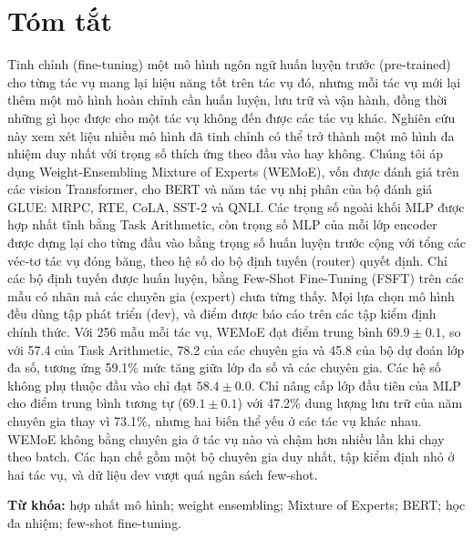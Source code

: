 \chapter*{Tóm tắt}

Tinh chỉnh (fine-tuning) một mô hình ngôn ngữ huấn luyện trước (pre-trained) cho từng tác vụ mang lại hiệu năng tốt trên tác vụ đó, nhưng mỗi tác vụ mới lại thêm một mô hình hoàn chỉnh cần huấn luyện, lưu trữ và vận hành, đồng thời những gì học được cho một tác vụ không đến được các tác vụ khác. Nghiên cứu này xem xét liệu nhiều mô hình đã tinh chỉnh có thể trở thành một mô hình đa nhiệm duy nhất với trọng số thích ứng theo đầu vào hay không. Chúng tôi áp dụng Weight-Ensembling Mixture of Experts (WEMoE), vốn được đánh giá trên các vision Transformer, cho BERT và năm tác vụ nhị phân của bộ đánh giá GLUE: MRPC, RTE, CoLA, SST-2 và QNLI. Các trọng số ngoài khối MLP được hợp nhất tĩnh bằng Task Arithmetic, còn trọng số MLP của mỗi lớp encoder được dựng lại cho từng đầu vào bằng trọng số huấn luyện trước cộng với tổng các véc-tơ tác vụ đóng băng, theo hệ số do bộ định tuyến (router) quyết định. Chỉ các bộ định tuyến được huấn luyện, bằng Few-Shot Fine-Tuning (FSFT) trên các mẫu có nhãn mà các chuyên gia (expert) chưa từng thấy. Mọi lựa chọn mô hình đều dùng tập phát triển (dev), và điểm được báo cáo trên các tập kiểm định chính thức. Với 256 mẫu mỗi tác vụ, WEMoE đạt điểm trung bình $69.9\pm0.1$, so với 57.4 của Task Arithmetic, 78.2 của các chuyên gia và 45.8 của bộ dự đoán lớp đa số, tương ứng 59.1\% mức tăng giữa lớp đa số và các chuyên gia. Các hệ số không phụ thuộc đầu vào chỉ đạt $58.4\pm0.0$. Chỉ nâng cấp lớp đầu tiên của MLP cho điểm trung bình tương tự ($69.1\pm0.1$) với 47.2\% dung lượng lưu trữ của năm chuyên gia thay vì 73.1\%, nhưng hai biến thể yếu ở các tác vụ khác nhau. WEMoE không bằng chuyên gia ở tác vụ nào và chậm hơn nhiều lần khi chạy theo batch. Các hạn chế gồm một bộ chuyên gia duy nhất, tập kiểm định nhỏ ở hai tác vụ, và dữ liệu dev vượt quá ngân sách few-shot.

\vspace{3mm}
\noindent\textbf{Từ khóa:} hợp nhất mô hình; weight ensembling; Mixture of Experts; BERT; học đa nhiệm; few-shot fine-tuning.
